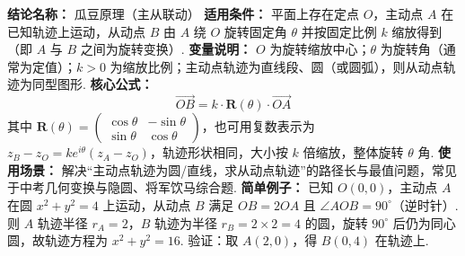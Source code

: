 \textbf{结论名称：} 瓜豆原理（主从联动）\newline
\textbf{适用条件：} 平面上存在定点 \(O\)，主动点 \(A\) 在已知轨迹上运动，从动点 \(B\) 由 \(A\) 绕 \(O\) 旋转固定角 \(\theta\) 并按固定比例 \(k\) 缩放得到（即 \(A\) 与 \(B\) 之间为旋转变换）.\newline
\textbf{变量说明：} \(O\) 为旋转缩放中心；\(\theta\) 为旋转角（通常为定值）；\(k>0\) 为缩放比例；主动点轨迹为直线段、圆（或圆弧），则从动点轨迹为同型图形.\newline
\textbf{核心公式：} 
\[
\boxed{\overrightarrow{OB} = k \cdot \mathbf{R}(\theta) \cdot \overrightarrow{OA}}
\]
其中 \(\mathbf{R}(\theta)=\begin{pmatrix}\cos\theta & -\sin\theta \\ \sin\theta & \cos\theta\end{pmatrix}\)，也可用复数表示为 \(z_B - z_O = k e^{i\theta}(z_A - z_O)\)，轨迹形状相同，大小按 \(k\) 倍缩放，整体旋转 \(\theta\) 角.\newline
\textbf{使用场景：} 解决“主动点轨迹为圆/直线，求从动点轨迹”的路径长与最值问题，常见于中考几何变换与隐圆、将军饮马综合题.\newline
\textbf{简单例子：} 已知 \(O(0,0)\)，主动点 \(A\) 在圆 \(x^2+y^2=4\) 上运动，从动点 \(B\) 满足 \(OB=2OA\) 且 \(\angle AOB=90^\circ\)（逆时针）. 则 \(A\) 轨迹半径 \(r_A=2\)，\(B\) 轨迹为半径 \(r_B=2\times2=4\) 的圆，旋转 \(90^\circ\) 后仍为同心圆，故轨迹方程为 \(x^2+y^2=16\). 验证：取 \(A(2,0)\)，得 \(B(0,4)\) 在轨迹上.